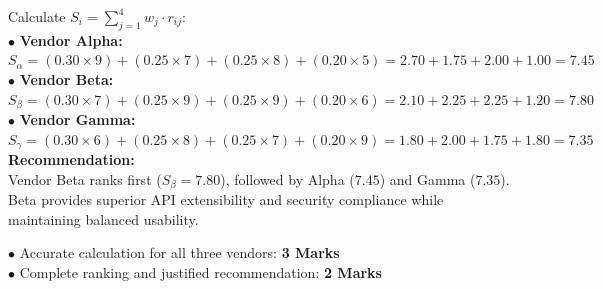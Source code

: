 \begin{solutionbox}
Calculate $S_i = \sum_{j=1}^4 w_j \cdot r_{ij}$:\\
$\bullet$ \textbf{Vendor Alpha:}\\
$S_\alpha = (0.30 \times 9) + (0.25 \times 7) + (0.25 \times 8) + (0.20 \times 5) = 2.70 + 1.75 + 2.00 + 1.00 = \mathbf{7.45}$\\
$\bullet$ \textbf{Vendor Beta:}\\
$S_\beta = (0.30 \times 7) + (0.25 \times 9) + (0.25 \times 9) + (0.20 \times 6) = 2.10 + 2.25 + 2.25 + 1.20 = \mathbf{7.80}$\\
$\bullet$ \textbf{Vendor Gamma:}\\
$S_\gamma = (0.30 \times 6) + (0.25 \times 8) + (0.25 \times 7) + (0.20 \times 9) = 1.80 + 2.00 + 1.75 + 1.80 = \mathbf{7.35}$\\
\textbf{Recommendation:}\\
Vendor Beta ranks first ($S_\beta = 7.80$), followed by Alpha ($7.45$) and Gamma ($7.35$). Beta provides superior API extensibility and security compliance while maintaining balanced usability.
\begin{markingrubric}
$\bullet$ Accurate calculation for all three vendors: \textbf{3 Marks}\\
$\bullet$ Complete ranking and justified recommendation: \textbf{2 Marks}
\end{markingrubric}
\end{solutionbox}

